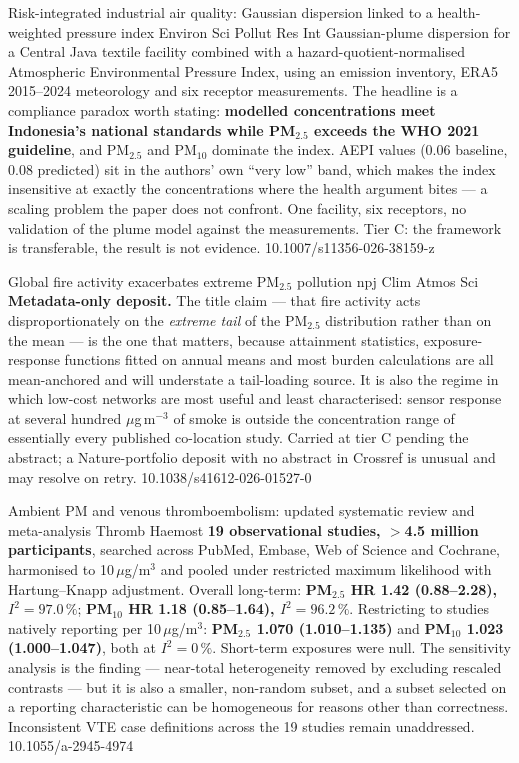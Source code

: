 \documentclass[10pt]{article}
\begin{document}
{Risk-integrated industrial air quality: Gaussian dispersion linked to a health-weighted pressure index}
{Environ Sci Pollut Res Int}
{Gaussian-plume dispersion for a Central Java textile facility combined with a
hazard-quotient-normalised Atmospheric Environmental Pressure Index, using an emission
inventory, ERA5 2015--2024 meteorology and six receptor measurements. The headline is a
compliance paradox worth stating: \textbf{modelled concentrations meet Indonesia's
national standards while PM$_{2.5}$ exceeds the WHO 2021 guideline}, and PM$_{2.5}$ and
PM$_{10}$ dominate the index. AEPI values (0.06 baseline, 0.08 predicted) sit in the
authors' own ``very low'' band, which makes the index insensitive at exactly the
concentrations where the health argument bites --- a scaling problem the paper does not
confront. One facility, six receptors, no validation of the plume model against the
measurements. Tier C: the framework is transferable, the result is not evidence.}
{10.1007/s11356-026-38159-z}

{Global fire activity exacerbates extreme PM$_{2.5}$ pollution}
{npj Clim Atmos Sci}
{\textbf{Metadata-only deposit.} The title claim --- that fire activity acts
disproportionately on the \emph{extreme tail} of the PM$_{2.5}$ distribution rather than
on the mean --- is the one that matters, because attainment statistics, exposure-response
functions fitted on annual means and most burden calculations are all mean-anchored and
will understate a tail-loading source. It is also the regime in which low-cost networks
are most useful and least characterised: sensor response at several hundred
$\mu$g\,m$^{-3}$ of smoke is outside the concentration range of essentially every
published co-location study. Carried at tier C pending the abstract; a Nature-portfolio
deposit with no abstract in Crossref is unusual and may resolve on retry.}
{10.1038/s41612-026-01527-0}


{Ambient PM and venous thromboembolism: updated systematic review and meta-analysis}
{Thromb Haemost}
{\textbf{19 observational studies, $>$4.5 million participants}, searched across PubMed,
Embase, Web of Science and Cochrane, harmonised to 10\,$\mu$g/m$^3$ and pooled under
restricted maximum likelihood with Hartung--Knapp adjustment. Overall long-term:
\textbf{PM$_{2.5}$ HR 1.42 (0.88--2.28), $I^2 = 97.0\,\%$}; \textbf{PM$_{10}$ HR 1.18
(0.85--1.64), $I^2 = 96.2\,\%$}. Restricting to studies natively reporting per
10\,$\mu$g/m$^3$: \textbf{PM$_{2.5}$ 1.070 (1.010--1.135)} and \textbf{PM$_{10}$ 1.023
(1.000--1.047)}, both at \textbf{$I^2 = 0\,\%$}. Short-term exposures were null. The
sensitivity analysis is the finding --- near-total heterogeneity removed by excluding
rescaled contrasts --- but it is also a smaller, non-random subset, and a subset selected
on a reporting characteristic can be homogeneous for reasons other than correctness.
Inconsistent VTE case definitions across the 19 studies remain unaddressed.}
{10.1055/a-2945-4974}
\end{document}
